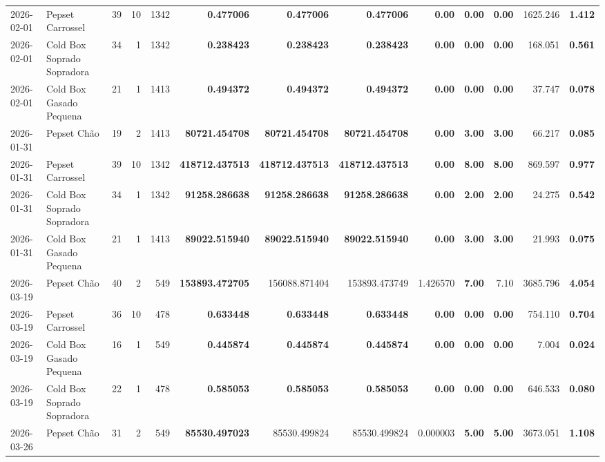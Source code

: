 {\begin{center}
{\begin{tabular}{@{}llrrrrrrrrrrr@{}}
2026-02-01 & Pepset Carrossel & 39 & 10 & 1342 & \textbf{0.477006} & \textbf{0.477006} & \textbf{0.477006} & \textbf{0.00} & \textbf{0.00} & \textbf{0.00} & 1625.246 & \textbf{1.412} \\
2026-02-01 & Cold Box Soprado Sopradora & 34 & 1 & 1342 & \textbf{0.238423} & \textbf{0.238423} & \textbf{0.238423} & \textbf{0.00} & \textbf{0.00} & \textbf{0.00} & 168.051 & \textbf{0.561} \\
2026-02-01 & Cold Box Gasado Pequena & 21 & 1 & 1413 & \textbf{0.494372} & \textbf{0.494372} & \textbf{0.494372} & \textbf{0.00} & \textbf{0.00} & \textbf{0.00} & 37.747 & \textbf{0.078} \\
2026-01-31 & Pepset Chão & 19 & 2 & 1413 & \textbf{80721.454708} & \textbf{80721.454708} & \textbf{80721.454708} & \textbf{0.00} & \textbf{3.00} & \textbf{3.00} & 66.217 & \textbf{0.085} \\
2026-01-31 & Pepset Carrossel & 39 & 10 & 1342 & \textbf{418712.437513} & \textbf{418712.437513} & \textbf{418712.437513} & \textbf{0.00} & \textbf{8.00} & \textbf{8.00} & 869.597 & \textbf{0.977} \\
2026-01-31 & Cold Box Soprado Sopradora & 34 & 1 & 1342 & \textbf{91258.286638} & \textbf{91258.286638} & \textbf{91258.286638} & \textbf{0.00} & \textbf{2.00} & \textbf{2.00} & 24.275 & \textbf{0.542} \\
2026-01-31 & Cold Box Gasado Pequena & 21 & 1 & 1413 & \textbf{89022.515940} & \textbf{89022.515940} & \textbf{89022.515940} & \textbf{0.00} & \textbf{3.00} & \textbf{3.00} & 21.993 & \textbf{0.075} \\
2026-03-19 & Pepset Chão & 40 & 2 & 549 & \textbf{153893.472705} & 156088.871404 & 153893.473749 & 1.426570 & \textbf{7.00} & 7.10 & 3685.796 & \textbf{4.054} \\
2026-03-19 & Pepset Carrossel & 36 & 10 & 478 & \textbf{0.633448} & \textbf{0.633448} & \textbf{0.633448} & \textbf{0.00} & \textbf{0.00} & \textbf{0.00} & 754.110 & \textbf{0.704} \\
2026-03-19 & Cold Box Gasado Pequena & 16 & 1 & 549 & \textbf{0.445874} & \textbf{0.445874} & \textbf{0.445874} & \textbf{0.00} & \textbf{0.00} & \textbf{0.00} & 7.004 & \textbf{0.024} \\
2026-03-19 & Cold Box Soprado Sopradora & 22 & 1 & 478 & \textbf{0.585053} & \textbf{0.585053} & \textbf{0.585053} & \textbf{0.00} & \textbf{0.00} & \textbf{0.00} & 646.533 & \textbf{0.080} \\
2026-03-26 & Pepset Chão & 31 & 2 & 549 & \textbf{85530.497023} & 85530.499824 & 85530.499824 & 0.000003 & \textbf{5.00} & \textbf{5.00} & 3673.051 & \textbf{1.108} \\

\end{tabular}}
\end{center}}
